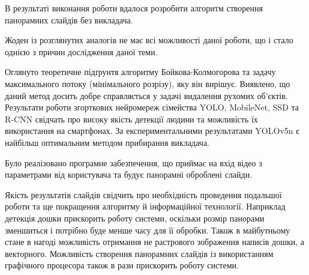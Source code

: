 В результаті виконання роботи вдалося
розробити алгоритм створення панорамних слайдів без викладача.


Жоден із розглянутих аналогів не має всі можливості даної роботи, що і стало однією
з причин дослідження даної теми.


Оглянуто теоретичне підґрунтя алгоритму Бойкова-Колмогорова та задачу
максимального потоку (мінімального розрізу), яку він вирішує. Виявлено, що
даний метод досить добре справляється у задачі видалення рухомих об'єктів.
Результати роботи згорткових нейромереж сімейства  YOLO, MobileNet, SSD та
R-CNN свідчать про високу якість детекції людини та можливість
їх використання на смартфонах. За експериментальними результатами YOLOv5n є найбільш оптимальним
методом прибирання викладача.


Було реалізовано програмне забезпечення,
що приймає на вхід відео з параметрами від користувача та
будує панорамні оброблені слайди.


Якість результатів слайдів свідчить про необхідність проведення подальшої роботи та
ще покращення алгоритму й інформаційної технології. Наприклад детекція дошки прискорить
роботу системи, оскільки розмір панорами зменшиться і потрібно буде менше часу для її обробки.
Також в майбутньому стане в нагоді можливість отримання не растрового зображення написів дошки, а
векторного. Можливість створення панорамних слайдів із використанням графічного процесора також 
в рази прискорить роботу системи. 
\clearpage